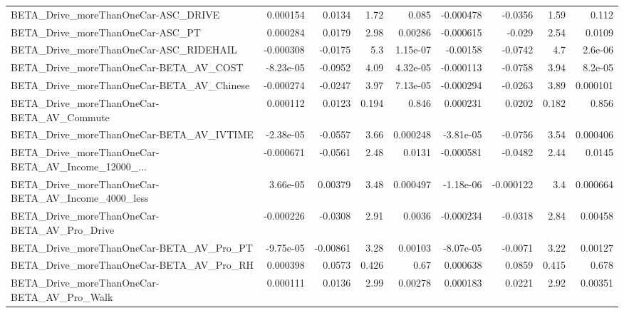 \begin{tabular}{lrrrrrrrr}
BETA\_Drive\_moreThanOneCar-ASC\_DRIVE                &    0.000154 &       0.0134 &      1.72 &    0.085 &  -0.000478 &     -0.0356 &         1.59 &         0.112 \\
BETA\_Drive\_moreThanOneCar-ASC\_PT                   &    0.000284 &       0.0179 &      2.98 &  0.00286 &  -0.000615 &      -0.029 &         2.54 &        0.0109 \\
BETA\_Drive\_moreThanOneCar-ASC\_RIDEHAIL             &   -0.000308 &      -0.0175 &       5.3 & 1.15e-07 &   -0.00158 &     -0.0742 &          4.7 &       2.6e-06 \\
BETA\_Drive\_moreThanOneCar-BETA\_AV\_COST             &   -8.23e-05 &      -0.0952 &      4.09 & 4.32e-05 &  -0.000113 &     -0.0758 &         3.94 &       8.2e-05 \\
BETA\_Drive\_moreThanOneCar-BETA\_AV\_Chinese          &   -0.000274 &      -0.0247 &      3.97 & 7.13e-05 &  -0.000294 &     -0.0263 &         3.89 &      0.000101 \\
BETA\_Drive\_moreThanOneCar-BETA\_AV\_Commute          &    0.000112 &       0.0123 &     0.194 &    0.846 &   0.000231 &      0.0202 &        0.182 &         0.856 \\
BETA\_Drive\_moreThanOneCar-BETA\_AV\_IVTIME           &   -2.38e-05 &      -0.0557 &      3.66 & 0.000248 &  -3.81e-05 &     -0.0756 &         3.54 &      0.000406 \\
BETA\_Drive\_moreThanOneCar-BETA\_AV\_Income\_12000\_... &   -0.000671 &      -0.0561 &      2.48 &   0.0131 &  -0.000581 &     -0.0482 &         2.44 &        0.0145 \\
BETA\_Drive\_moreThanOneCar-BETA\_AV\_Income\_4000\_less &    3.66e-05 &      0.00379 &      3.48 & 0.000497 &  -1.18e-06 &   -0.000122 &          3.4 &      0.000664 \\
BETA\_Drive\_moreThanOneCar-BETA\_AV\_Pro\_Drive        &   -0.000226 &      -0.0308 &      2.91 &   0.0036 &  -0.000234 &     -0.0318 &         2.84 &       0.00458 \\
BETA\_Drive\_moreThanOneCar-BETA\_AV\_Pro\_PT           &   -9.75e-05 &     -0.00861 &      3.28 &  0.00103 &  -8.07e-05 &     -0.0071 &         3.22 &       0.00127 \\
BETA\_Drive\_moreThanOneCar-BETA\_AV\_Pro\_RH           &    0.000398 &       0.0573 &     0.426 &     0.67 &   0.000638 &      0.0859 &        0.415 &         0.678 \\
BETA\_Drive\_moreThanOneCar-BETA\_AV\_Pro\_Walk         &    0.000111 &       0.0136 &      2.99 &  0.00278 &   0.000183 &      0.0221 &         2.92 &       0.00351 \\

\end{tabular}
